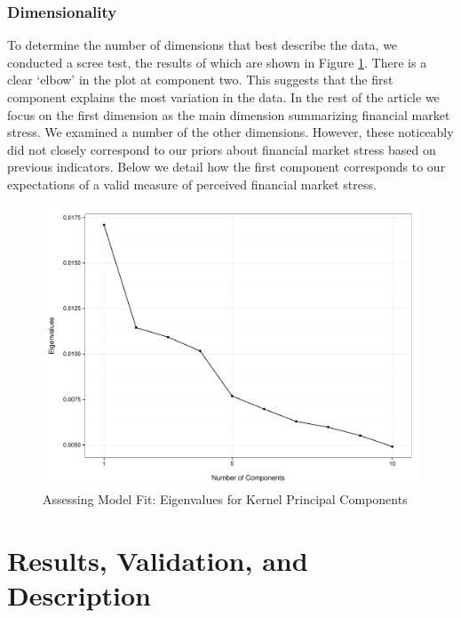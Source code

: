 \documentclass[]{article}
\begin{document}
\subsubsection{Dimensionality}\label{dimensionality}

To determine the number of dimensions that best describe the data, we conducted a scree test, the results of which are shown in Figure \ref{scree_plot}. There is a clear `elbow' in the plot at component two. This suggests that the first component explains the most variation in the data. In the rest of the article we focus on the first dimension as the main dimension summarizing financial market stress. We examined a number of the other dimensions. However, these noticeably did not closely correspond to our priors about financial market stress based on previous indicators. Below we detail how the first component corresponds to our expectations of a valid measure of perceived financial market stress.

\begin{figure}
    \caption{Assessing Model Fit: Eigenvalues for Kernel Principal Components}
    \label{scree_plot}
    \begin{center}
        \includegraphics[scale=0.5]{analysis/figures/scree_plot.pdf}
    \end{center}
\end{figure}

\section{Results, Validation, and Description}\label{results}
\end{document}
